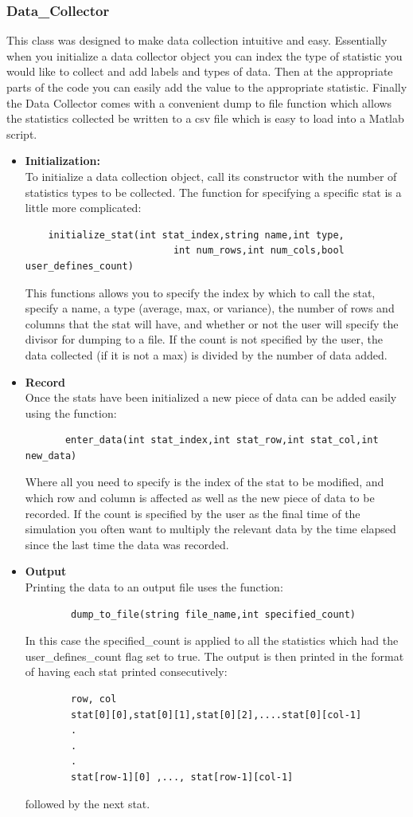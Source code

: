 \documentclass[11pt]{article}%
\begin{document}
\subsubsection{Data\_Collector}
This class was designed to make data collection intuitive and easy.  Essentially when you initialize a data collector object you can index the type of statistic you would like to collect and add labels and types of data.  Then at the appropriate parts of the code you can easily add the value to the appropriate statistic.  Finally the Data Collector comes with a convenient dump to file function which allows the statistics collected be written to a csv file which is easy to load into a Matlab script.
\begin{itemize}
\item {\bf Initialization:}\\
To initialize a data collection object, call its constructor with the number of statistics types to be collected.  The function for specifying a specific stat is a little more complicated:
\begin{verbatim}
	initialize_stat(int stat_index,string name,int type,
	                      int num_rows,int num_cols,bool user_defines_count)
\end{verbatim}
This functions allows you to specify the index by which to call the stat, specify a name, a type (average, max, or variance), the number of rows and columns that the stat will have, and whether or not the user will specify the divisor for dumping to a file.  If the count is not specified by the user, the data collected (if it is not a max) is divided by the number of data added.
\item {\bf Record}\\
Once the stats have been initialized a new piece of data can be added easily using the function:
\begin{verbatim}
       enter_data(int stat_index,int stat_row,int stat_col,int new_data)
\end{verbatim}
Where all you need to specify is the index of the stat to be modified, and which row and column is affected as well as the new piece of data to be recorded.  If the count is specified by the user as the final time of the simulation you often want to multiply the relevant data by the time elapsed since the last time the data was recorded.
\item {\bf Output}\\
Printing the data to an output file uses the function:
\begin{verbatim}
        dump_to_file(string file_name,int specified_count)
\end{verbatim}
  In this case the specified\_count is applied to all the statistics which had the user\_defines\_count flag set to true.  The output is then printed in the format of having each stat printed consecutively:
  \begin{verbatim}
        row, col
        stat[0][0],stat[0][1],stat[0][2],....stat[0][col-1]
        .
        .
        .
        stat[row-1][0] ,..., stat[row-1][col-1]
\end{verbatim}
followed by the next stat.
\end{itemize}
\end{document}
